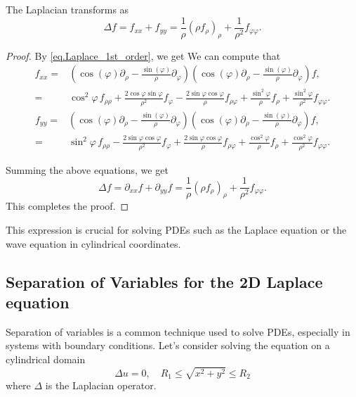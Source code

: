 \begin{proposition}[]
The Laplacian transforms as
\begin{equation}\label{eq.Laplace_2nd_order}
    \Delta f = f_{xx} + f_{yy} = \frac{1}{\rho} ( \rho f_\rho)_\rho + \frac{1}{\rho^2} f_{\varphi\varphi}.
\end{equation}
\end{proposition}
\begin{proof} By \eqref{eq.Laplace_1st_order}, we get
We can compute that
\begin{equation}
\begin{split}
    f_{xx}=&\left(\cos(\varphi) \partial_\rho - \frac{\sin(\varphi)}{\rho} \partial_\varphi\right)\left(\cos(\varphi) \partial_\rho - \frac{\sin(\varphi)}{\rho} \partial_\varphi\right)f,
    \\
    =&\cos ^2 \varphi\, f_{\rho\rho}+\frac{2 \cos \varphi \sin \varphi}{\rho^2} f_{\varphi}-\frac{2 \sin \varphi \cos \varphi}{\rho} f_{\rho\varphi}+\frac{\sin ^2 \varphi}{\rho} f_{\rho}+\frac{\sin ^2 \varphi}{\rho^2} f_{\varphi\varphi}. 
\end{split}
\end{equation}
\begin{equation}
\begin{split}
    f_{yy}=&\left(\cos(\varphi) \partial_\rho - \frac{\sin(\varphi)}{\rho} \partial_\varphi\right)\left(\cos(\varphi) \partial_\rho - \frac{\sin(\varphi)}{\rho} \partial_\varphi\right)f,
    \\
    =&\sin ^2 \varphi\, f_{\rho\rho}-\frac{2 \sin \varphi \cos \varphi}{\rho^2} f_{\varphi}+\frac{2 \sin \varphi \cos \varphi}{\rho} f_{\rho\varphi}+\frac{\cos ^2 \varphi}{\rho} f_{\rho}+\frac{\cos ^2 \varphi}{\rho^2} f_{\varphi\varphi}.
\end{split}
\end{equation}

Summing the above equations, we get
\begin{equation}
    \Delta f = \partial_{xx} f + \partial_{yy} f = \frac{1}{\rho} ( \rho f_\rho)_\rho + \frac{1}{\rho^2} f_{\varphi\varphi}.
\end{equation}
This completes the proof.
\end{proof}


This expression is crucial for solving PDEs such as the Laplace equation or the wave equation in cylindrical coordinates.

\subsection{Separation of Variables for the 2D Laplace equation}
Separation of variables is a common technique used to solve PDEs, especially in systems with boundary conditions. Let's consider solving the equation on a cylindrical domain
\begin{equation} 
    \Delta u = 0, \quad R_1 \leq \sqrt{x^2+y^2} \leq R_2
\end{equation}
where $\Delta$ is the Laplacian operator.


